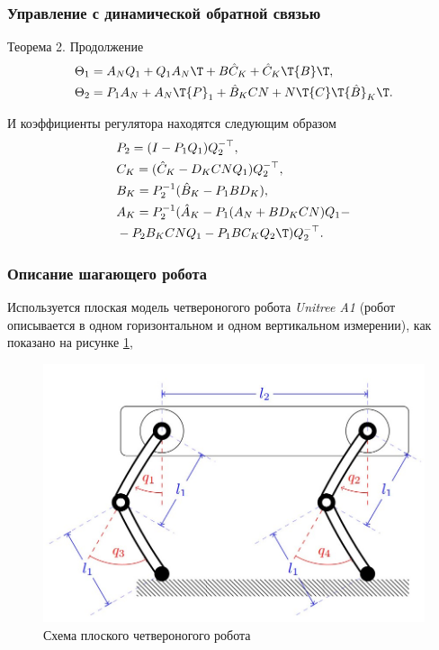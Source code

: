 \begin{frame}
	\frametitle{Управление с динамической обратной связью}
	\begin{block}{Теорема 2. Продолжение}
	\begin{align*}
		&{\Theta}_1 = {A}_N{Q}_{1} +{Q}_{1}{A}_N\T + {B}{\hat{C}}_K +{\hat{C}}_K\T{B}\T, \\
		&{\Theta}_2 = {P}_{1}{A}_N +{A}_N\T{P}_{1}+{\hat{B}}_K{C}{N}+{N}\T{C}\T{\hat{B}}_K\T.
	\end{align*}
	
	И коэффициенты регулятора находятся следующим образом 
	\begin{align*}
		&{P}_{2} = ({I}-{P}_{1}{Q}_{1}){Q}_{2}^{-\top},\\
		&{C}_K = ({\hat{C}}_K - {D}_K {C} {N} {Q}_{1} ){Q}_{2}^{-\top},\\
		&{B}_K = {P}_{2}^{-1}({\hat{B}}_K- {P}_{1}{B}{D}_K),\\
		&{A}_K = {P}_{2}^{-1}({\hat{A}}_K-{P}_{1}({A}_N+{B}{D}_K{C}{N}){Q}_{1} -\\ 
		& - {P}_{2}{B}_K{C}{N}{Q}_{1}-{P}_{1} {B}{C}_K{Q}_{2}\T){Q}_{2}^{-\top}.
	\end{align*}
\end{block}
\end{frame}

\begin{frame}
	\frametitle{Описание шагающего робота}
	Используется плоская модель четвероногого робота \textit{Unitree A1} (робот описывается в одном горизонтальном и одном вертикальном измерении), как показано на рисунке \ref{fig:flat_robot},
	\begin{figure}
		\centering
		\includegraphics[width=0.7\linewidth]{images/FlatQuadruped.jpeg}
		\caption{Схема плоского четвероногого робота}
		\label{fig:flat_robot}
	\end{figure}
\end{frame}

